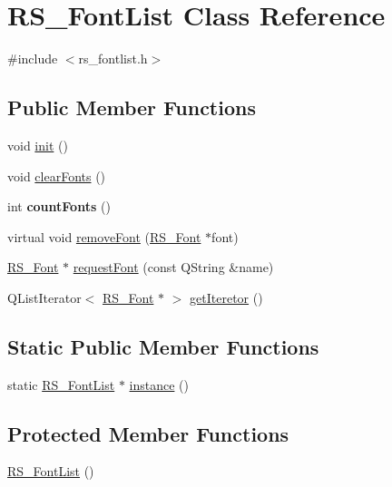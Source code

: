\hypertarget{classRS__FontList}{\section{R\-S\-\_\-\-Font\-List Class Reference}
\label{classRS__FontList}
}


{\ttfamily \#include $<$rs\-\_\-fontlist.\-h$>$}

\subsection*{Public Member Functions}
\begin{DoxyCompactItemize}
\item 
void \hyperlink{classRS__FontList_a3fc059b979528808a12e7cca411289a3}{init} ()
\item 
void \hyperlink{classRS__FontList_ae912dcb9679d8c8deec731b2709cf958}{clear\-Fonts} ()
\item 
\hypertarget{classRS__FontList_acffe5357e58671d025d9f17a583c910f}{int {\bfseries count\-Fonts} ()}\label{classRS__FontList_acffe5357e58671d025d9f17a583c910f}

\item 
virtual void \hyperlink{classRS__FontList_af49497812f26f2978216a0775a221ee9}{remove\-Font} (\hyperlink{classRS__Font}{R\-S\-\_\-\-Font} $\ast$font)
\item 
\hyperlink{classRS__Font}{R\-S\-\_\-\-Font} $\ast$ \hyperlink{classRS__FontList_a7df208482c106a314c6a481226d8254a}{request\-Font} (const Q\-String \&name)
\item 
Q\-List\-Iterator$<$ \hyperlink{classRS__Font}{R\-S\-\_\-\-Font} $\ast$ $>$ \hyperlink{classRS__FontList_a31898bbe03fc2f1402e29b474e2d99db}{get\-Iteretor} ()
\end{DoxyCompactItemize}
\subsection*{Static Public Member Functions}
\begin{DoxyCompactItemize}
\item 
static \hyperlink{classRS__FontList}{R\-S\-\_\-\-Font\-List} $\ast$ \hyperlink{classRS__FontList_a9ab9576f5b4ed9435b98f119e777b4f8}{instance} ()
\end{DoxyCompactItemize}
\subsection*{Protected Member Functions}
\begin{DoxyCompactItemize}
\item 
\hyperlink{classRS__FontList_a65a46c1977ff8ad8135fa6807bfac819}{R\-S\-\_\-\-Font\-List} ()
\end{DoxyCompactItemize}
